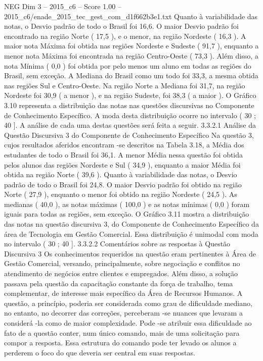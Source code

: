 \begin{textsample}{NEG Dim 3 – 2015\_c6 – Score 1.00 – 2015\_c6/enade\_2015\_tec\_gest\_com\_d1f662b3e1.txt}
Quanto à variabilidade das notas, o Desvio padrão de todo o Brasil foi 16,6.
O maior Desvio padrão foi encontrado na região Norte ( 17,5 ), e o menor, na região Nordeste ( 16,3 ).
A maior nota Máxima foi obtida nas regiões Nordeste e Sudeste ( 91,7 ), enquanto a menor nota Máxima foi encontrada na região Centro-Oeste ( 73,3 ).
Além disso, a nota Mínima ( 0,0 ) foi obtida por pelo menos um aluno em todas as regiões do Brasil, sem exceção.
A Mediana do Brasil como um todo foi 33,3, a mesma obtida nas regiões Sul e Centro-Oeste.
Na região Norte a Mediana foi 31,7, na região Nordeste foi 30,9 ( a menor ), e na região Sudeste, foi 38,3 ( a maior ).
O Gráfico 3.10 representa a distribuição das notas nas questões discursivas no Componente de Conhecimento Específico.
A moda desta distribuição ocorre no intervalo ( 30 ; 40 ].
A análise de cada uma destas questões será feita a seguir. 3.3.2.1 Análise da Questão Discursiva 3 do Componente de Conhecimento Específico Na questão 3, cujos resultados aferidos encontram -se descritos na Tabela 3.18, a Média dos estudantes de todo o Brasil foi 36,1.
A menor Média nessa questão foi obtida pelos alunos das regiões Nordeste e Sul ( 34,9 ), enquanto a maior Média foi obtida na região Norte ( 39,6 ).
Quanto à variabilidade das notas, o Desvio padrão de todo o Brasil foi 24,8.
O maior Desvio padrão foi obtido na região Norte ( 27,9 ), enquanto o menor foi obtido na região Nordeste ( 24,5 ).
As medianas ( 40,0 ), as notas máximas ( 100,0 ) e as notas mínimas ( 0,0 ) foram iguais para todas as regiões, sem exceção.
O Gráfico 3.11 mostra a distribuição das notas na questão discursiva 3, do Componente de Conhecimento Específico da área de Tecnologia em Gestão Comercial.
Essa distribuição é unimodal com moda no intervalo ( 30 ; 40 ]. 3.3.2.2 Comentários sobre as respostas à Questão Discursiva 3 Os conhecimentos requeridos na questão eram pertinentes à Área de Gestão Comercial, versando, principalmente, sobre negociação e conflitos no atendimento de negócios entre clientes e empregados.
Além disso, a solução passava pela questão da capacitação constante da força de trabalho, tema complementar, de interesse mais específico da Área de Recursos Humanos.
A questão, a princípio, poderia ser considerada como grau de dificuldade mediano, no entanto, no decorrer das correções, perceberam -se nuances que levaram a considerá -la como de maior complexidade.
Pode -se atribuir essa dificuldade ao fato de a questão conter, num único comando, mais de uma solicitação para compor a resposta.
Essa estrutura do comando pode ter levado os alunos a perderem o foco do que deveria ser central em suas respostas.

\end{textsample}
